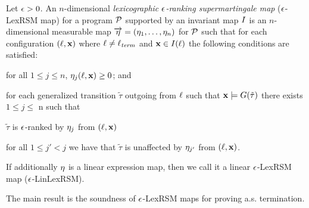 \begin{definition}
Let $\epsilon>0$. An $n$-dimensional \emph{lexicographic $\epsilon$-ranking 
supermartingale map} ($\epsilon$-LexRSM map) for a program $\mathcal{P}$ supported by 
an invariant map $I$ is an $n$-dimensional measurable map 
$\overrightarrow{\eta}=(\eta_1,\dots,\eta_n)$ for $\mathcal{P}$ such that for each 
configuration $(\ell,\mathbf{x})$ where $\ell\neq \ell_{\mathit{term}}$ and $\mathbf{x}\in 
I(\ell)$ the following conditions are satisfied:
 \begin{compactitem}
 	\item
 	for all $1\leq j \leq n$, $\eta_j(\ell,\mathbf{x})\geq 0$; and
 	\item 
 	for each generalized transition $\tilde{\tau}$ outgoing from $\ell$ such that $\mathbf{x}\models G(\tilde\tau)$ there 
 	exists $1\leq j 
 	\leq$ n such that
 	\begin{compactitem}
 	\item
 	$\tilde{\tau}$ is $\epsilon$-ranked by $\eta_j$ from $(\ell,\mathbf{x})$
 	\item
 	for all $1\leq j'<j$ we have that $\tilde{\tau}$ is unaffected by 
 	$\eta_{j'}$ from $(\ell,\mathbf{x})$.
 	\end{compactitem}
 \end{compactitem}
If additionally $\eta$ is a linear expression map, then we call it a linear 
$\epsilon$-LexRSM map ($\epsilon$-LinLexRSM).
\end{definition}


The main result is the soundness of $\epsilon$-LexRSM maps for proving a.s. 
termination.


